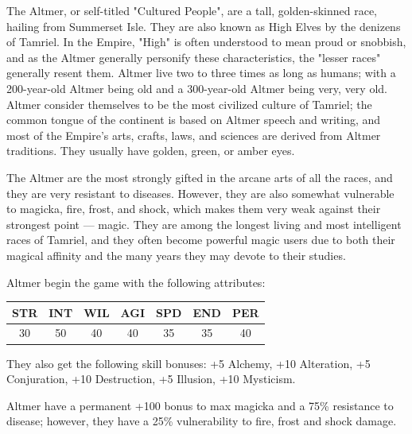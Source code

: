\documentclass[12pt]{book}
\begin{document}
The Altmer, or self-titled "Cultured People", are a tall, golden-skinned race, hailing from Summerset Isle. They are also known as High Elves by the denizens of Tamriel. In the Empire, "High" is often understood to mean proud or snobbish, and as the Altmer generally personify these characteristics, the "lesser races" generally resent them. Altmer live two to three times as long as humans; with a 200-year-old Altmer being old and a 300-year-old Altmer being very, very old. Altmer consider themselves to be the most civilized culture of Tamriel; the common tongue of the continent is based on Altmer speech and writing, and most of the Empire's arts, crafts, laws, and sciences are derived from Altmer traditions. They usually have golden, green, or amber eyes.

The Altmer are the most strongly gifted in the arcane arts of all the races, and they are very resistant to diseases. However, they are also somewhat vulnerable to magicka, fire, frost, and shock, which makes them very weak against their strongest point --- magic. They are among the longest living and most intelligent races of Tamriel, and they often become powerful magic users due to both their magical affinity and the many years they may devote to their studies.

Altmer begin the game with the following attributes:

\begin{center}
\begin{tabular}{|c|c|c|c|c|c|c|}
\hline
STR & INT & WIL & AGI & SPD & END & PER\\ \hline
30 & 50 & 40 & 40 & 35 & 35 & 40\\ \hline
\end{tabular}
\end{center}

They also get the following skill bonuses: +5 Alchemy, +10 Alteration, +5 Conjuration, +10 Destruction, +5 Illusion, +10 Mysticism.

Altmer have a permanent +100 bonus to max magicka and a 75\% resistance to disease; however, they have a 25\% vulnerability to fire, frost and shock damage.\\
\end{document}
